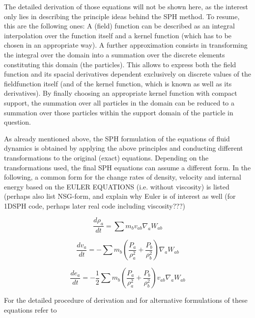 \documentclass{report}
\begin{document}
The detailed derivation of those equations will not be shown here, as the
interest  only lies in describing the principle ideas behind the SPH
method. To resume, this are the following ones: A (field) function can be
described as an integral interpolation over the function itself and a kernel
function (which has to be chosen in an appropriate way). A further
approximation consists in transforming the integral over the domain into a
summation over the discrete elements constituting this domain (the particles). This allows to express both
the field function and its spacial derivatives dependent exclusively on discrete values
of the fieldfunction itself (and of the kernel function, which is known as well as
its derivatives). By finally choosing an appropriate kernel function with
compact support, the summation over all particles in the domain can be reduced
to a summation over those particles within the support domain of the particle
in question.

As already mentioned above, the SPH formulation of the equations of fluid
dynamics is obtained by applying the above principles and conducting different
transformations to the original (exact) equations. Depending on the
transformations used, the final SPH equations can assume a different form. In
the following, a common form for the change rates of density, velocity and
internal energy based on the EULER EQUATIONS (i.e. without viscosity) is
listed\cite{Monaghan2005,Liu2003} (perhaps also list NSG-form, and
explain why Euler is of interest as well (for 1DSPH code, perhaps later real
code including viscosity???)

\begin{equation}
\label{eq:DCR_Euler}
\frac{d\rho _a}{\mathit{dt}}=\sum{m_{b}v_{\mathit{ab}}\nabla _{a}W_{\mathit{ab}}}
\end{equation}

\begin{equation}
\label{eq:VCR_Euler}
\frac{dv_{a}}{\mathit{dt}}=-\sum {m_{b}\left(\frac{P_{a}}{\rho_{a}^{2}}+\frac{P_{b}}{\rho _{b}^{2}}\right)\nabla_{a}W_{ab}}
\end{equation}


\begin{equation}
\label{eq:ECR_Euler}
\frac{de_{a}}{\mathit{dt}}=-\mathit{}\frac{1}{2}\sum{m_{b}\left(\frac{P_{a}}{\rho _{a}^{2}}+\frac{P_{b}}{\rho _{b}^{2}}\right)v_{\mathit{ab}}\nabla _{a}W_{\mathit{ab}}}
\end{equation}

For the detailed procedure of derivation and for alternative formulations of
these equations refer to \cite{Monaghan2005, Liu2003}
\end{document}
